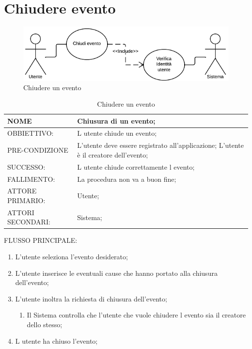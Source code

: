 \section{Chiudere evento}
\begin{figure}[H]
\centering
\includegraphics[scale=0.60]{img/use/Chiude.png}
\caption{Chiudere un evento}
\label{fig:Chiudere}
\end{figure}
\begin{table}[H]
\begin{tabular}{p{}|p{}}
\toprule
NOME & Chiusura di un evento;\\
\hline
OBBIETTIVO: & L utente chiude un evento;\\
\hline
PRE-CONDIZIONE & L'utente deve essere registrato all'applicazione;
L'utente è il creatore dell'evento;\\
\hline
SUCCESSO: & L utente chiude correttamente l evento;\\
\hline
FALLIMENTO: & La procedura non va a buon fine;\\
\hline
ATTORE PRIMARIO: & Utente;\\
\hline
ATTORI SECONDARI: & Sistema;\\
\bottomrule
\end{tabular}
\caption{Chiudere un evento}
\label{table:chiude}
\end{table}	
FLUSSO PRINCIPALE:
\begin{enumerate}
\item L'utente seleziona l'evento desiderato;
\item L'utente inserisce le eventuali cause che hanno portato alla chiusura dell'evento;
\item L'utente inoltra la richiesta di chiusura dell'evento;
\begin{enumerate}
\item Il Sistema controlla che l'utente che vuole chiudere l evento sia il creatore dello stesso;
\end{enumerate}
\item L utente ha chiuso l'evento;
\end{enumerate}

